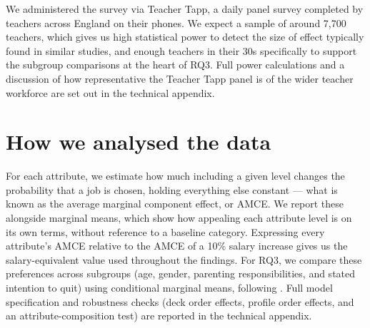 We administered the survey via Teacher Tapp, a daily panel survey completed by teachers across
England on their phones. We expect a sample of around 7,700 teachers, which gives us high
statistical power to detect the size of effect typically found in similar studies, and enough
teachers in their 30s specifically to support the subgroup comparisons at the heart of RQ3. Full
power calculations and a discussion of how representative the Teacher Tapp panel is of the wider
teacher workforce are set out in the technical appendix.

\section{How we analysed the data}

For each attribute, we estimate how much including a given level changes the probability that a
job is chosen, holding everything else constant --- what is known as the average marginal
component effect, or AMCE. We report these alongside marginal means, which show how appealing
each attribute level is on its own terms, without reference to a baseline category. Expressing
every attribute's AMCE relative to the AMCE of a 10\% salary increase gives us the
salary-equivalent value used throughout the findings. For RQ3, we compare these preferences
across subgroups (age, gender, parenting responsibilities, and stated intention to quit) using
conditional marginal means, following \citet{leeper2020measuring}. Full model specification and
robustness checks (deck order effects, profile order effects, and an attribute-composition test)
are reported in the technical appendix.

